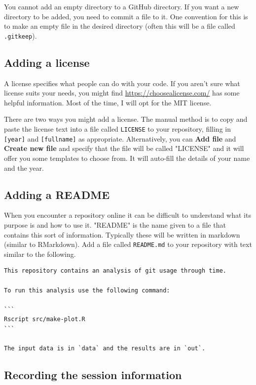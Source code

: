 \documentclass[11pt,onecolumn]{scrartcl}
\begin{document}
You cannot add an empty directory to a GitHub directory. If you want a new
directory to be added, you need to commit a file to it. One convention for this
is to make an empty file in the desired directory (often this will be a file
called \texttt{.gitkeep}).

\subsection{Adding a license}
\label{sec:org107427a}

A license specifies what people can do with your code. If you aren't sure what
license suits your needs, you might find \url{https://choosealicense.com/} has some
helpful information. Most of the time, I will opt for the MIT license.

There are two ways you might add a license. The manual method is to copy and
paste the license text into a file called \texttt{LICENSE} to your repository, filling in
\texttt{[year]} and \texttt{[fullname]} as appropriate. Alternatively, you can \textbf{Add file} and \textbf{Create
new file} and specify that the file will be called "LICENSE" and it will offer
you some templates to choose from. It will auto-fill the details of your name
and the year.

\subsection{Adding a README}
\label{sec:org5f03008}

When you encounter a repository online it can be difficult to understand what
its purpose is and how to use it. "README" is the name given to a file that
contains this sort of information. Typically these will be written in markdown
(similar to RMarkdown). Add a file called \texttt{README.md} to your repository with text
similar to the following.

\lstset{language=sh,label= ,caption= ,captionpos=b,numbers=none}
\begin{lstlisting}
This repository contains an analysis of git usage through time.

To run this analysis use the following command:

```
Rscript src/make-plot.R
```

The input data is in `data` and the results are in `out`.
\end{lstlisting}

\subsection{Recording the session information}
\label{sec:orgcbfab40}
\end{document}
